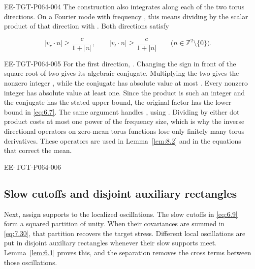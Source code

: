 \begin{EESegment}{EE-TGT-P064-004}
The construction also integrates along each of the two torus directions. On a Fourier mode with frequency , this means dividing by the scalar product of that direction with . Both directions satisfy
\end{EESegment}
\begin{equation}
 |v_r\mathbin\cdot n|\ge\frac c{1+|n|},
 \qquad
 |v_t\mathbin\cdot n|\ge\frac c{1+|n|}
 \qquad \bigl(n\in\mathbb Z^2\setminus\{0\}\bigr).
 \tag{6.7}\label{eq:6.7}
\end{equation}
\begin{EESegment}{EE-TGT-P064-005}
For the first direction, . Changing the sign in front of the square root of two gives its algebraic conjugate. Multiplying the two gives the nonzero integer , while the conjugate has absolute value at most . Every nonzero integer has absolute value at least one. Since the product is such an integer and the conjugate has the stated upper bound, the original factor has the lower bound in \eqref{eq:6.7}. The same argument handles , using . Dividing by either dot product costs at most one power of the frequency size, which is why the inverse directional operators on zero-mean torus functions lose only finitely many torus derivatives. These operators are used in Lemma~\ref{lem:8.2} and in the equations that correct the mean.
\end{EESegment}

\begin{EESegment}{EE-TGT-P064-006}
\subsection{Slow cutoffs and disjoint auxiliary rectangles}\label{sec:6.2}

Next, assign supports to the localized oscillations. The slow cutoffs in \eqref{eq:6.9} form a squared partition of unity. When their covariances are summed in \eqref{eq:7.30}, that partition recovers the target stress. Different local oscillations are put in disjoint auxiliary rectangles whenever their slow supports meet. Lemma~\ref{lem:6.1} proves this, and the separation removes the cross terms between those oscillations.
\end{EESegment}

